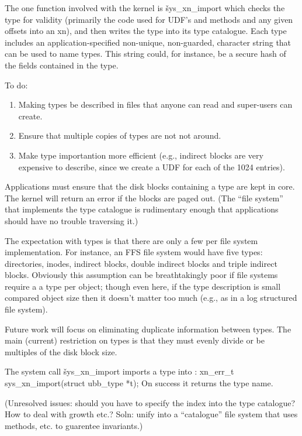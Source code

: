 The one function involved with the kernel is \v{sys\_xn\_import} which
checks the type for validity (primarily the code used for UDF's and
methods and any given offsets into an xn), and then writes the type
into its type catalogue.  Each type includes an application-specified
non-unique, non-guarded, character string that can be used to name
types.  This string could, for instance, be a secure hash of the fields
contained in the type.

To do:
\begin{enumerate}
	\item Making types be described in files that anyone can read and
	super-users can create.

	\item Ensure that multiple copies of types are not not around.
	
	\item Make type importantion more efficient (e.g., indirect
	blocks are very expensive to describe, since we create	
	a UDF for each of the 1024 entries).
\end{enumerate}

Applications must ensure that the disk blocks containing a type are
kept in core.  The kernel will return an error if the blocks are
paged out.  (The ``file system'' that implements the type catalogue
is rudimentary enough that applications should have no trouble 
traversing it.)  

The expectation with types is that there are only a few per file system
implementation.  For instance, an FFS file system would have five types:
directories, inodes, indirect blocks, double indirect blocks and triple
indirect blocks.  Obviously this assumption can be breathtakingly poor
if file systems require a a type per object; though even here,
if the type description is small compared object size then it doesn't
matter too much (e.g., as in a log structured file system).

Future work will focus on eliminating duplicate information between
types.  The main (current) restriction on types is that they must
evenly divide or be multiples of the disk block size.

The system call \v{sys\_xn\_import} imports a type into \xxx :
xn_err_t sys_xn_import(struct ubb_type *t);
On success it returns the type name.  

(Unresolved issues: should you
have to specify the index into the type catalogue?  How to deal with
growth etc.?  Soln: unify into a ``catalogue'' file system that uses
methods, etc. to guarentee invariants.)

